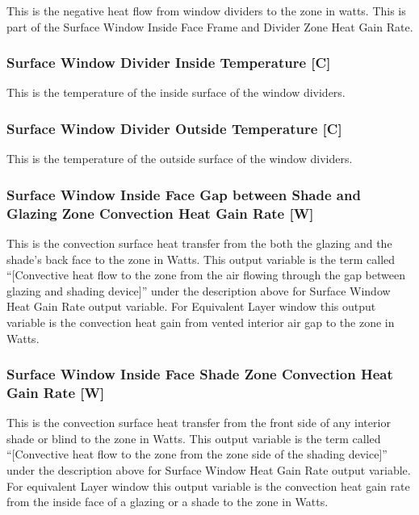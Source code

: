 This is the negative heat flow from window dividers to the zone in watts. This is part of the Surface Window Inside Face Frame and Divider Zone Heat Gain Rate.

\subsubsection{Surface Window Divider Inside Temperature {[}C{]}}\label{surface-window-divider-inside-temperature-c}

This is the temperature of the inside surface of the window dividers.

\subsubsection{Surface Window Divider Outside Temperature {[}C{]}}\label{surface-window-divider-outside-temperature-c}

This is the temperature of the outside surface of the window dividers.

\subsubsection{Surface Window Inside Face Gap between Shade and Glazing Zone Convection Heat Gain Rate {[}W{]}}\label{surface-window-inside-face-gap-between-shade-and-glazing-zone-convection-heat-gain-rate-w}

This is the convection surface heat transfer from the both the glazing and the shade's back face to the zone in Watts. This output variable is the term called ``{[}Convective heat flow to the zone from the air flowing through the gap between glazing and shading device{]}'' under the description above for Surface Window Heat Gain Rate output variable. For Equivalent Layer window this output variable is the convection heat gain from vented interior air gap to the zone in Watts.

\subsubsection{Surface Window Inside Face Shade Zone Convection Heat Gain Rate {[}W{]}}\label{surface-window-inside-face-shade-zone-convection-heat-gain-rate-w}

This is the convection surface heat transfer from the front side of any interior shade or blind to the zone in Watts. This output variable is the term called ``{[}Convective heat flow to the zone from the zone side of the shading device{]}'' under the description above for Surface Window Heat Gain Rate output variable. For equivalent Layer window this output variable is the convection heat gain rate from the inside face of a glazing or a shade to the zone in Watts.

